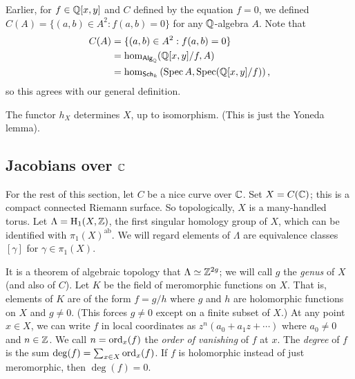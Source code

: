 \documentclass{article}
\begin{document}
Earlier, for $f\in \mathbb{Q}[x,y]$ and $C$ defined by the equation $f=0$, we 
defined $C(A)=\{(a,b)\in A^2:f(a,b)=0\}$ for any $\mathbb{Q}$-algebra $A$. 
Note that 
\begin{align*}
  C(A) &= \{(a,b)\in A^2:f(a,b) = 0\} \\
    &= \hom_{\mathsf{Alg}_{\mathbb{Q}}}(\mathbb{Q}[x,y]/f,A) \\
    &= \hom_{\mathsf{Sch}_k}\left(\operatorname{Spec} A,\operatorname{Spec}(\mathbb{Q}[x,y]/f)\right) \text{,}
\end{align*}
so this agrees with our general definition. 

\begin{remark}
The functor $h_X$ determines $X$, up to isomorphism. (This is just the Yoneda 
lemma).
\end{remark}





\subsection*{Jacobians over $\mathbb{C}$}

For the rest of this section, let $C$ be a nice curve over $\mathbb{C}$. Set 
$X=C(\mathbb{C})$; this is a compact connected Riemann surface. So 
topologically, $X$ is a many-handled torus. Let $\Lambda=\operatorname{H}_1(X,\mathbb{Z})$, 
the first singular homology group of $X$, which can be identified with 
$\pi_1(X)^\text{ab}$. We will regard elements of $\Lambda$ are equivalence 
classes $[\gamma]$ for $\gamma\in \pi_1(X)$. 


It is a theorem of algebraic topology that $\Lambda\simeq\mathbb{Z}^{2 g}$; we 
will call $g$ the \emph{genus} of $X$ (and also of $C$). Let $K$ be the field 
of meromorphic functions on $X$. That is, elements of $K$ are of the 
form $f=g/h$ where $g$ and $h$ are holomorphic functions on $X$ and $g\ne 0$. 
(This forces $g\ne 0$ except on a finite subset of $X$.) At any point 
$x\in X$, we can write $f$ in local coordinates as $z^n(a_0+a_1 z+\cdots)$ 
where $a_0\ne 0$ and $n\in\mathbb{Z}$. We call $n=\operatorname{ord}_x(f)$ the \emph{order 
of vanishing} of $f$ at $x$. The \emph{degree} of $f$ is the sum 
$\deg(f)=\sum_{x\in X}\operatorname{ord}_x(f)$. If $f$ is holomorphic instead of just 
meromorphic, then $\deg(f)=0$.  
 
\end{document}
